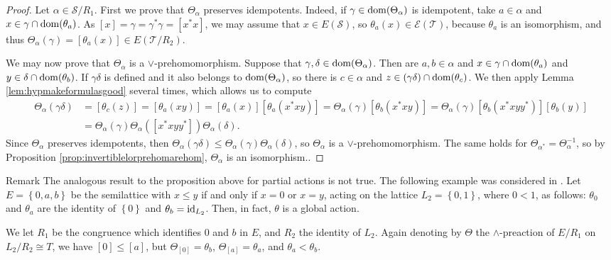 \begin{proof}
    Let $\alpha\in\mathcal{S}/R_1$. First we prove that $\Theta_\alpha$ preserves idempotents. Indeed, if $\gamma\in\operatorname{dom}(\Theta_\alpha)$ is idempotent, take $a\in\alpha$ and $x\in\gamma\cap\operatorname{dom}(\theta_a)$. As $[x]=\gamma=\gamma^*\gamma=[x^*x]$, we may assume that $x\in E(\mathcal{S})$, so $\theta_a(x)\in\mathcal{E}(\mathcal{T})$, because $\theta_a$ is an isomorphism, and thus $\Theta_\alpha(\gamma)=[\theta_a(x)]\in E(\mathcal{T}/R_2)$.
    
    We may now prove that $\Theta_{\alpha}$ is a $\lor$-prehomomorphism. Suppose that $\gamma,\delta\in\operatorname{dom}(\Theta_\alpha)$. Then are $a,b\in\alpha$ and $x\in\gamma\cap\operatorname{dom}(\theta_a)$ and $y\in\delta\cap\operatorname{dom}(\theta_b)$. If $\gamma\delta$ is defined and it also belongs to $\operatorname{dom}(\Theta_\alpha)$, so there is $c\in\alpha$ and $z\in(\gamma\delta)\cap\operatorname{dom}(\theta_c)$. We then apply Lemma \ref{lem:hypmakeformulasgood} several times, which allows us to compute
    \begin{align*}
        \Theta_\alpha(\gamma\delta)&=[\theta_c(z)]=[\theta_a(xy)]=[\theta_a(x)][\theta_a(x^*xy)]=\Theta_\alpha(\gamma)[\theta_b(x^*xy)]=\Theta_\alpha(\gamma)[\theta_b(x^*xyy^*)][\theta_b(y)]\\
        &=\Theta_\alpha(\gamma)\Theta_\alpha([x^*xyy^*])\Theta_\alpha(\delta).
    \end{align*}
    Since $\Theta_\alpha$ preserves idempotents, then $\Theta_\alpha(\gamma\delta)\leq\Theta_\alpha(\gamma)\Theta_\alpha(\delta)$, so $\Theta_\alpha$ is a $\lor$-prehomomorphism. The same holds for $\Theta_{\alpha^*}=\Theta_\alpha^{-1}$, so by Proposition \ref{prop:invertiblelorprehomarehom}, $\Theta_\alpha$ is an isomorphism.\qedhere.
\end{proof}

\begin{denv*}{Remark}
    The analogous result to the proposition above for partial actions is not true. The following example was considered in \cite[Example 4.5]{Mikola2017}. Let $E=\left\{0,a,b\right\}$ be the semilattice with $x\leq y$ if and only if $x=0$ or $x=y$, acting on the lattice $L_2=\left\{0,1\right\}$, where $0<1$, as follows: $\theta_0$ and $\theta_a$ are the identity of $\left\{0\right\}$ and $\theta_b=\operatorname{id}_{L_2}$. Then, in fact, $\theta$ is a global action.
    
    We let $R_1$ be the congruence which identifies $0$ and $b$ in $E$, and $R_2$ the identity of $L_2$. Again denoting by $\Theta$ the $\land$-preaction of $E/R_1$ on $L_2/R_2\cong T$, we have $[0]\leq[a]$, but $\Theta_{[0]}=\theta_b$, $\Theta_{[a]}=\theta_a$, and $\theta_a<\theta_b$.
\end{denv*}

